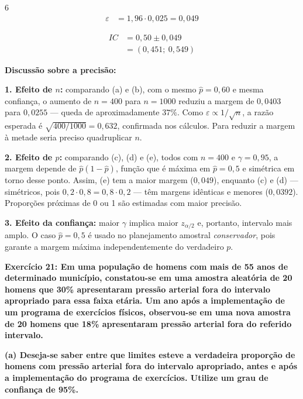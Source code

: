 \documentclass[8pt, a4paper, landscape]{extarticle}
\begin{document}
\begin{multicols}{6}
\begin{equation*}
\begin{split}
\varepsilon &= 1,96 \cdot 0,025 = 0,049
\end{split}
\end{equation*}

\begin{equation*}
\begin{split}
IC &= 0,50 \pm 0,049 \\
&= (0,451;\ 0,549)
\end{split}
\end{equation*}

\vspace{0.2cm}

\textbf{Discussão sobre a precisão:}

\textbf{1. Efeito de $n$:} comparando (a) e (b), com o mesmo $\hat{p} = 0,60$ e mesma confiança, o aumento de $n = 400$ para $n = 1000$ reduziu a margem de $0,0403$ para $0,0255$ — queda de aproximadamente $37\%$. Como $\varepsilon \propto 1/\sqrt{n}$, a razão esperada é $\sqrt{400/1000} = 0,632$, confirmada nos cálculos. Para reduzir a margem à metade seria preciso quadruplicar $n$.

\textbf{2. Efeito de $p$:} comparando (c), (d) e (e), todos com $n = 400$ e $\gamma = 0,95$, a margem depende de $\hat{p}(1-\hat{p})$, função que é máxima em $\hat{p} = 0,5$ e simétrica em torno desse ponto. Assim, (e) tem a maior margem ($0,049$), enquanto (c) e (d) — simétricos, pois $0,2 \cdot 0,8 = 0,8 \cdot 0,2$ — têm margens idênticas e menores ($0,0392$). Proporções próximas de 0 ou 1 são estimadas com maior precisão.

\textbf{3. Efeito da confiança:} maior $\gamma$ implica maior $z_{\alpha/2}$ e, portanto, intervalo mais amplo. O caso $\hat{p} = 0,5$ é usado no planejamento amostral \textit{conservador}, pois garante a margem máxima independentemente do verdadeiro $p$.

\textbf{Exercício 21: Em uma população de homens com mais de 55 anos de determinado município, constatou-se em uma amostra aleatória de 20 homens que 30\% apresentaram pressão arterial fora do intervalo apropriado para essa faixa etária. Um ano após a implementação de um programa de exercícios físicos, observou-se em uma nova amostra de 20 homens que 18\% apresentaram pressão arterial fora do referido intervalo.}

\textbf{(a) Deseja-se saber entre que limites esteve a verdadeira proporção de homens com pressão arterial fora do intervalo apropriado, antes e após a implementação do programa de exercícios. Utilize um grau de confiança de 95\%.}


\end{multicols}
\end{document}
